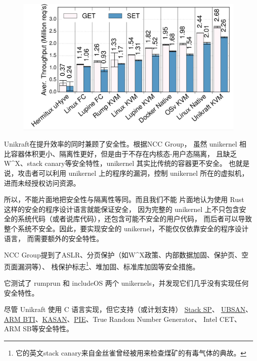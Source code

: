 \documentclass{../runikraft-report}
\begin{document}
\begin{figure}[H]
\begin{minipage}{0.32\linewidth}
\includegraphics[width=1\linewidth]{assets/Unikraft-throughput.png}
\caption{}
\end{minipage}
\end{figure}

Unikraft在提升效率的同时兼顾了安全性。根据NCC Group\cite{bib:unikernel-secuirty}，
虽然 unikernel 相比容器体积更小、隔离性更好，但是由于不存在内核态-用户态隔离，
且缺乏W\^{}X、stack canary等安全特性，unikernel 其实比传统的容器更不安全。
也就是说，攻击者可以利用 unikernel 上的程序的漏洞，控制 unikernel 所在的虚拟机，
进而未经授权访问资源。

所以，不能片面地把安全性与隔离性等同。而且我们不能
片面地认为使用 Rust 这样的安全的程序设计语言就能保证安全，
因为完整的 unikernel 上不只包含安全的系统代码（或者说库代码），还包含可能不安全的用户代码，
而后者可以导致整个系统不安全。因此，要实现安全的 unikernel，不能仅仅依靠安全的程序设计语言，
而需要额外的安全特性。

NCC Group提到了ASLR、分页保护（如W\^{}X政策、内部数据加固、保护页、空页面漏洞等）、
栈保护标志\footnote{它的英文stack canary来自金丝雀曾经被用来检查煤矿的有毒气体的典故\cite{bib:canary}。}、堆加固、标准库加固等安全措施。

它测试了 rumprun 和 includeOS 两个 unikernels，并发现它们几乎没有实现任何安全特性。

尽管 Unikraft 使用 C 语言实现，但它支持（或计划支持）
\href{https://github.com/unikraft/unikraft/tree/staging/lib/uksp}{Stack SP}、
\href{https://github.com/unikraft/unikraft/tree/staging/lib/ubsan}{UBSAN}、
\href{https://github.com/unikraft/unikraft/pull/421}{ARM BTI}、\href{https://github.com/unikraft/unikraft/pull/191}{KASAN}、\href{https://github.com/unikraft/unikraft/pull/239}{PIE}、True Random Number Generator、
Intel CET、ARM SB等安全特性。\cite{bib:unikraft-secuirty}
\end{document}
